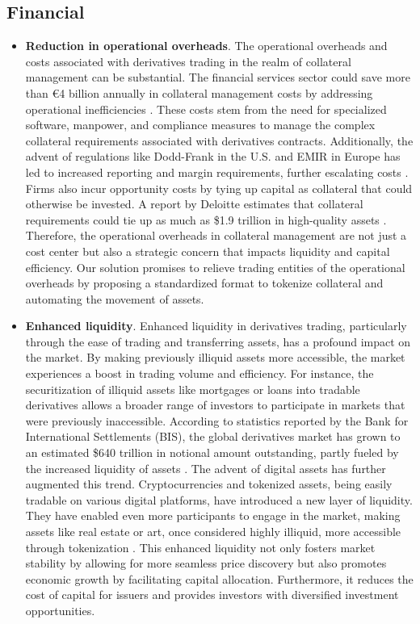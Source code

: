 \subsection{Financial}
\label{subsec:benefits_financial}

\begin{itemize}
    \item \textbf{Reduction in operational overheads}. The operational overheads and costs associated with derivatives trading in the realm of collateral management can be substantial. The financial services sector could save more than €4 billion annually in collateral management costs by addressing operational inefficiencies \citep{accenture}. These costs stem from the need for specialized software, manpower, and compliance measures to manage the complex collateral requirements associated with derivatives contracts. Additionally, the advent of regulations like Dodd-Frank in the U.S. \citep{dodd-frank} and EMIR \citep{EMIR} in Europe has led to increased reporting and margin requirements, further escalating costs \citep{costs_doddfrank_emir}. Firms also incur opportunity costs by tying up capital as collateral that could otherwise be invested. A report by Deloitte estimates that collateral requirements could tie up as much as \$1.9 trillion in high-quality assets \citep{deloitte_costs}. Therefore, the operational overheads in collateral management are not just a cost center but also a strategic concern that impacts liquidity and capital efficiency. Our solution promises to relieve trading entities of the operational overheads by proposing a standardized format to tokenize collateral and automating the movement of assets.


    \item \textbf{Enhanced liquidity}. Enhanced liquidity in derivatives trading, particularly through the ease of trading and transferring assets, has a profound impact on the market. By making previously illiquid assets more accessible, the market experiences a boost in trading volume and efficiency. For instance, the securitization of illiquid assets like mortgages or loans into tradable derivatives allows a broader range of investors to participate in markets that were previously inaccessible. According to statistics reported by the Bank for International Settlements (BIS), the global derivatives market has grown to an estimated \$640 trillion in notional amount outstanding, partly fueled by the increased liquidity of assets \citep{bis_costs}. The advent of digital assets has further augmented this trend. Cryptocurrencies and tokenized assets, being easily tradable on various digital platforms, have introduced a new layer of liquidity. They have enabled even more participants to engage in the market, making assets like real estate or art, once considered highly illiquid, more accessible through tokenization \citep{digital_asset_tokenization}. This enhanced liquidity not only fosters market stability by allowing for more seamless price discovery but also promotes economic growth by facilitating capital allocation. Furthermore, it reduces the cost of capital for issuers and provides investors with diversified investment opportunities.


\end{itemize}
